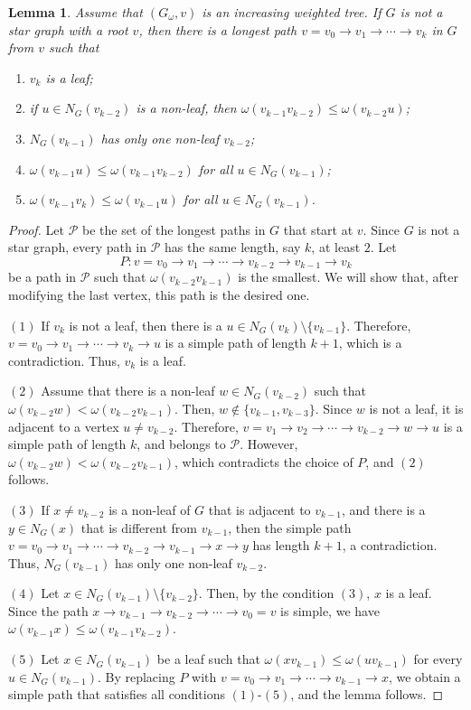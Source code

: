 \documentclass[12pt,amscd]{amsart}
\newtheorem{lem}[thm]{Lemma}
\theoremstyle{definition}
\begin{document}
\medskip

\begin{lem}\label{path} Assume that $(G_\omega,v)$ is an increasing weighted tree. If $G$ is not a star  graph with a root $v$, then there is a longest path $v= v_0\to v_1\to\cdots\to v_k$ in $G$ from  $v$ such that
\begin{enumerate}
    \item $v_k$ is a leaf;
    \item if $u\in N_G(v_{k-2})$ is a non-leaf, then $\omega(v_{k-1}v_{k-2})\leqslant \omega(v_{k-2}u)$;
    \item $N_G(v_{k-1})$ has only one non-leaf $v_{k-2}$;
    \item $\omega(v_{k-1}u) \leqslant \omega(v_{k-1}v_{k-2})$ for all $u\in N_G(v_{k-1})$;
    \item $\omega(v_{k-1}v_k) \leqslant \omega(v_{k-1}u)$ for all $u\in N_G(v_{k-1})$.
\end{enumerate}
\end{lem}

\begin{proof}
Let $\mathcal{P}$ be the set of the longest paths in $G$ that start at $v$. Since $G$ is not a star  graph, every path in $\mathcal{P}$ has the same length, say $k$, at least $2$. Let 
$$P \colon v= v_0\to v_1\to \cdots \to v_{k-2}\to v_{k-1}\to v_k$$
be a path in $\mathcal{P}$ such that $\omega(v_{k-2}v_{k-1})$ is the smallest.  We will show that, after modifying the last vertex,  this path is the desired one.

$(1)$ If $v_k$ is not a leaf, then there is a $u\in N_G(v_k)\setminus \{v_{k-1}\}$. Therefore,  $v=v_0\to v_1\to\cdots\to v_k\to u$ is a simple path of length $k+1$, which is a contradiction. Thus, $v_k$ is a leaf.

$(2)$ Assume that there is a non-leaf $w\in N_G(v_{k-2})$ such that $\omega(v_{k-2}w)<\omega(v_{k-2}v_{k-1})$. Then, $w\notin \{v_{k-1},v_{k-3}\}$. Since $w$ is not a leaf,  it is adjacent to a vertex $u\ne v_{k-2}$. Therefore, $v=v_1\to v_2\to\cdots\to v_{k-2}\to w\to u$ is a simple path of length $k$, and  belongs to $\mathcal{P}$. However, $\omega(v_{k-2}w)<\omega(v_{k-2}v_{k-1})$, which contradicts the choice of $P$, and $(2)$ follows.


$(3)$ If $x\neq v_{k-2}$ is a non-leaf of $G$ that is adjacent to $v_{k-1}$, and  there is a $y \in N_G(x)$ that is different from $v_{k-1}$, then the simple path $v=v_0\to v_1\to\cdots\to v_{k-2}\to v_{k-1}\to x\to y$ has length $k+1$, a contradiction. Thus,  $N_G(v_{k-1})$ has only one non-leaf $v_{k-2}$.

$(4)$ Let $x\in N_G(v_{k-1})\setminus\{v_{k-2}\}$. Then,  by the condition $(3)$,  $x$ is a leaf. Since the path $x\to v_{k-1}\to v_{k-2}\to\cdots \to v_0=v$ is simple, we have $\omega(v_{k-1}x)\leqslant \omega(v_{k-1}v_{k-2})$.

$(5)$ Let $x\in N_G(v_{k-1})$ be a leaf such that $\omega(xv_{k-1})\leqslant \omega(uv_{k-1})$ for every $u\in N_G(v_{k-1})$. By replacing $P$ with  $v=v_0\to v_1\to\cdots\to v_{k-1}\to x$, we obtain a simple path that satisfies all conditions $(1)$-$(5)$, and the lemma follows.
\end{proof}
\end{document}
